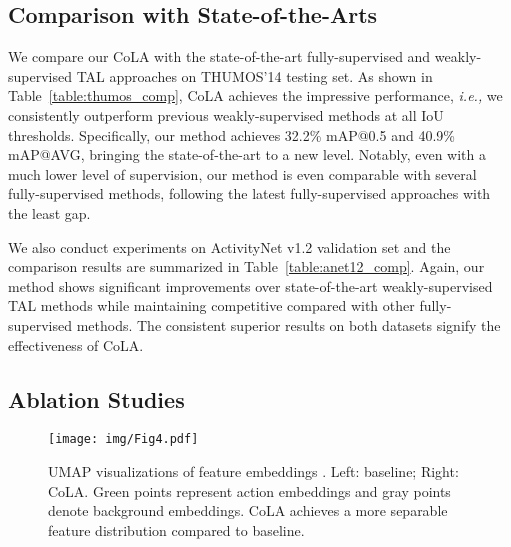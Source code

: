 \documentclass[final]{cvpr}
\begin{document}
\begin{table*}[t]
\subsection{Comparison with State-of-the-Arts}

We compare our CoLA with the state-of-the-art fully-supervised and weakly-supervised TAL approaches on THUMOS'14 testing set. As shown in Table~\ref{table:thumos_comp}, CoLA achieves the impressive performance, \textit{i.e.,} we consistently outperform previous weakly-supervised methods at all IoU thresholds. Specifically, our method achieves 32.2\% mAP@0.5 and 40.9\% mAP@AVG, bringing the state-of-the-art to a new level. Notably, even with a much lower level of supervision, our method is even comparable with several fully-supervised methods, following the latest fully-supervised approaches with the least gap.

We also conduct experiments on ActivityNet v1.2 validation set and the comparison results are summarized in Table~\ref{table:anet12_comp}. Again, our method shows significant improvements over state-of-the-art weakly-supervised TAL methods while maintaining competitive compared with other fully-supervised methods. The consistent superior results on both datasets signify the effectiveness of CoLA. 


\subsection{Ablation Studies}
\label{subsec:abExp}
\begin{table}[!t]
\begin{center}
\caption{Ablation analysis on loss terms on THUMOS'14.}
\label{table:abla_contrast}
\end{center}
\vspace{-10pt}
\end{table}

\begin{figure}[!t]
\begin{center}
\texttt{[image: img/Fig4.pdf]}
\end{center}
\vspace{-6pt}
   \caption{UMAP visualizations of feature embeddings . Left: baseline; Right: CoLA. Green points represent action embeddings and gray points denote background embeddings. CoLA achieves a more separable feature distribution compared to baseline.}
\label{fig:feats_vis}
\end{figure}


\end{table*}
\end{document}
